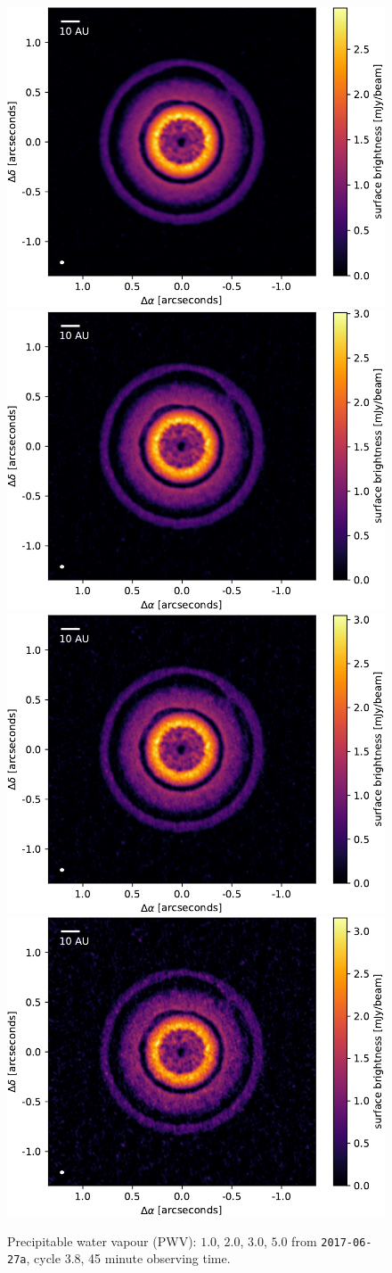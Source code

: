 \documentclass[usenatbib,a4paper,times,fleqn]{mnras}
\begin{document}
\begin{figure}
   \begin{center}
      \includegraphics[width=0.48\columnwidth]{figs/pwv_1.0.pdf}
      \includegraphics[width=0.48\columnwidth]{figs/pwv_2.0.pdf}\\
      \includegraphics[width=0.48\columnwidth]{figs/pwv_3.0.pdf}
      \includegraphics[width=0.48\columnwidth]{figs/pwv_5.0.pdf}
      \caption{Precipitable water vapour (PWV)\@: $1.0$, $2.0$, $3.0$, $5.0$
      from \texttt{2017-06-27a}, cycle 3.8, 45 minute observing time.}
      \label{fig:pwv}
   \end{center}
\end{figure}
\end{document}
